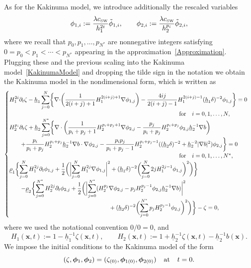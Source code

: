 \documentclass[11pt,leqno]{article}
\numberwithin{equation}{section}
\numberwithin{figure}{section}
\begin{document}
As for the Kakinuma model, we introduce additionally the rescaled variables 
%
\[
\phi_{1,i} := \frac{\lambda c_{\mbox{\rm\tiny SW}}}{h_1^{2i}} \tilde\phi_{1,i}, 
 \qquad \phi_{2,i} := \frac{\lambda c_{\mbox{\rm\tiny SW}}}{h_2^{p_i}}\tilde{\phi}_{2,i}, 
\]
%
where we recall that  $p_0,p_1,\ldots,p_{N^*}$ are nonnegative integers satisfying ${0=p_0<p_1<\cdots<p_{N^*}}$ 
appearing in the approximation~\eqref{Approximation}.
Plugging these and the previous scaling into the Kakinuma model~\eqref{KakinumaModel} 
and dropping the tilde sign in the notation we obtain the Kakinuma model in the nondimensional form, 
which is written as 
%
\begin{equation}\label{Kakinuma-dimensionless}
\begin{cases}
\displaystyle
 H_1^{2i}\partial_t\zeta - \underline{h}_1 \sum_{j=0}^N \biggl\{ \nabla\cdot\biggr(
  \frac{1}{2(i+j)+1}H_1^{2(i+j)+1}\nabla\phi_{1,j} \biggr) 
  - \frac{4ij}{2(i+j)-1}H_1^{2(i+j)-1}(\underline{h}_1\delta)^{-2}\phi_{1,j} \biggr\}=0 \\
\makebox[29em]{}\mbox{for}\quad i=0,1,\ldots,N, \\
\displaystyle
  H_2^{p_i}\partial_t\zeta + \underline{h}_2 \sum_{j=0}^{N^*} \biggl\{ \nabla \cdot \biggl(
   \frac{1}{p_i+p_j+1} H_2^{p_i+p_j+1} \nabla\phi_{2,j}
   - \frac{p_j}{p_i+p_j} H_2^{p_i+p_j} \phi_{2,j} \underline{h}_2^{-1}\nabla b \biggr) \\
\displaystyle\qquad
   + \frac{p_i}{p_i+p_j} H_2^{p_i+p_j} \underline{h}_2^{-1}\nabla b \cdot \nabla\phi_{2,j}
   - \frac{p_ip_j}{p_i+p_j-1} H_2^{p_i+p_j-1} ((\underline{h}_2\delta)^{-2} + \underline{h}_2^{-2}|\nabla b|^2) \phi_{2,j} \biggr\} = 0 \\
\makebox[29em]{}\mbox{for}\quad i=0,1,\ldots,N^*, \\
\displaystyle
 \underline{\rho}_1\biggl\{ \sum_{j=0}^N H_1^{2j}\partial_t\phi_{1,j} + \frac12\biggl(
  \biggl|\sum_{j=0}^N H_1^{2j}\nabla\phi_{1,j} \biggr|^2
  + (\underline{h}_1\delta)^{-2}\biggl(\sum_{j=0}^N2jH_1^{2j-1} \phi_{1,j} \biggr)^2 \biggr) \biggr\} \\
\displaystyle
\qquad
 - \underline{\rho}_2\biggl\{ \sum_{j=0}^{N^*} H_2^{2j}\partial_t\phi_{2,j} + \frac12\biggl(
  \biggl|\sum_{j=0}^{N^*} ( H_2^{p_j}\nabla\phi_{2,j} - p_j H_2^{p_j-1}\phi_{2,j} \underline{h}_2^{-1}\nabla b )\biggr|^2 \\
\displaystyle\makebox[17em]{}
  + (\underline{h}_2\delta)^{-2}\biggl( \sum_{j=0}^{N^*} p_j H_2^{p_j-1} \phi_{2,j} \biggr)^2 \biggr)
   \biggr\}
 - \zeta = 0,
\end{cases}
\end{equation}
%
where we used the notational convention $0/0 = 0$, and
%
\begin{equation}\label{thicknesses}
H_1(\bm{x},t) := 1 - \underline{h}_1^{-1}\zeta(\bm{x},t), \qquad 
H_2(\bm{x},t) := 1 + \underline{h}_2^{-1}\zeta(\bm{x},t) - \underline{h}_2^{-1}b(\bm{x}).
\end{equation}
%
We impose the initial conditions to the Kakinuma model of the form 
%
\begin{equation}\label{Kaki:IC}
(\zeta,\bm{\phi}_1,\bm{\phi}_2)=(\zeta_{(0)},\bm{\phi}_{1(0)},\bm{\phi}_{2(0)})
 \makebox[3em]{at} t=0. 
\end{equation}
\end{document}
